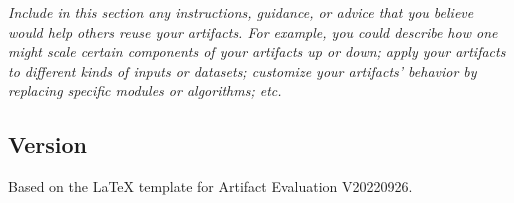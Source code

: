 \documentclass[sigconf]{acmart}
\begin{document}
\emph{Include in this section any instructions, guidance, or advice
that you believe would help others reuse your artifacts.  For example,
you could describe how one might scale certain components of your
artifacts up or down; apply your artifacts to different kinds of
inputs or datasets; customize your artifacts' behavior by replacing
specific modules or algorithms; etc.}


\subsection{Version}
Based on the LaTeX template for Artifact Evaluation V20220926.

\end{document}
